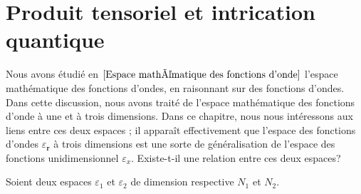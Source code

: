 \documentclass[../notesdecours.tex]{subfiles}
\begin{document}
\part{Produit tensoriel et intrication quantique}

Nous avons étudié en $\ref{Espace mathématique des fonctions d'onde}$ l'espace mathématique des fonctions d'ondes, en raisonnant sur des fonctions d'ondes. Dans cette discussion, nous avons traité de l'espace mathématique des fonctions d'onde à une et à trois dimensions. Dans ce chapitre, nous nous intéressons aux liens entre ces deux espaces ; il apparaît effectivement que l'espace des fonctions d'ondes $\mathcal{\varepsilon}_{\bm{r}}$ à trois dimensions est une sorte de généralisation de l'espace des fonctions unidimensionnel $\mathcal{\varepsilon}_x$. Existe-t-il une relation entre ces deux espaces?\\

\begin{remark} Soient deux espaces $\varepsilon_1$ et $\varepsilon_2$ de dimension respective $N_1$ et $N_2$. \end{remark}
\end{document}
